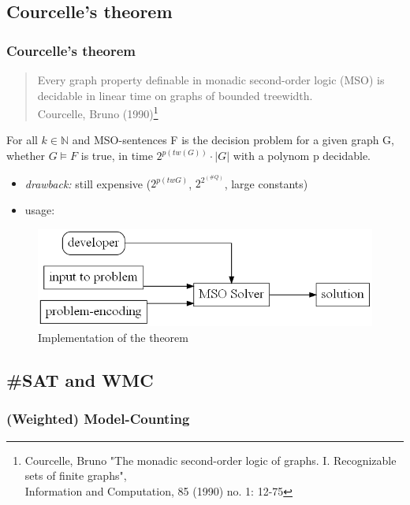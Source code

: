 \documentclass[c,8pt,xcolor...,x11names]{beamer}
\begin{document}
\subsection[Courcelle]{Courcelle's theorem}
\begin{frame}
	\frametitle{Courcelle's theorem}

	\begin{quotation}
		Every graph property definable in monadic second-order logic (MSO) is decidable in linear time on graphs of bounded treewidth. \\
		\hfill {\small Courcelle, Bruno (1990)}\footnote{Courcelle, Bruno "The monadic second-order logic of graphs. I. Recognizable sets of finite graphs",\\ Information and Computation, 85 (1990) no. 1: 12-75}
	\end{quotation}

	\medskip \pause
	For all $k \in \mathbb{N}$ and MSO-sentences F is the decision problem for a given graph G, whether $G \models F$ is true, in time $2^{p(tw(G))} \cdot |G|$ with a polynom p decidable.
	\medskip \pause
	\begin{itemize}

		\item \emph{drawback:} still expensive ($2^{p(tw G)}$, $2^{2^{(\#Q)}}$, large constants) \smallskip \pause
		\item usage:

	\end{itemize}
	\begin{figure}
		\includegraphics[height=0.2\textheight]{images/UsageCourcelle.gv.png}
		\caption{Implementation of the theorem}
	\end{figure}
\end{frame}
\subsection{\#SAT and WMC}
\begin{frame}
	\frametitle{(Weighted) Model-Counting}
\end{frame}
\end{document}
